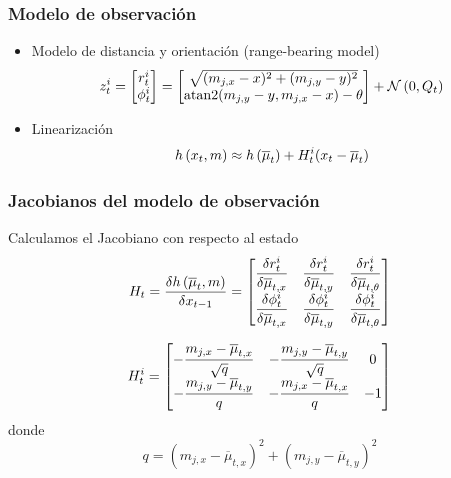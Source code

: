 \begin{frame}
	\frametitle{Modelo de observación}
	\begin{itemize}
	\item Modelo de distancia y orientación (range-bearing model)
	\begin{equation*}
		z_{t}^{i} =
		\begin{bmatrix}
			r_{t}^{i}\\
			\phi_{t}^{i} 
		\end{bmatrix} =
		\begin{bmatrix}
			\sqrt{(m_{j,x}-x)^{2} + (m_{j,y}-y)^{2}}\\
			\operatorname{atan2}(m_{j,y}-y, m_{j,x}-x) -\theta
		\end{bmatrix}
		+ \mathcal{N}\left( {0}, {Q_{t}} \right)		
	\end{equation*}
	
	\item Linearización
	\begin{equation*}
	h\left( x_{t}, m \right) \approx 			h\left( \overline{\mu}_{t} \right) + H_{t}^{i}(x_{t}-\overline{\mu}_{t})
	\end{equation*}
	\end{itemize}
	
\end{frame}

\begin{frame}
	\frametitle{Jacobianos del modelo de observación}
	Calculamos el Jacobiano con respecto al estado
	\begin{equation*}
		H_{t} = \dfrac{\delta h\left( \overline{\mu}_{t},m \right)}{\delta x_{t-1}} =
		\begin{bmatrix}
			\dfrac{\delta r_{t}^{i}}{\delta \overline{\mu}_{t,x}} & \dfrac{\delta r_{t}^{i}}{\delta \overline{\mu}_{t,y}} & \dfrac{\delta r_{t}^{i}}{\delta \overline{\mu}_{t,\theta}}\\
			\dfrac{\delta \phi_{t}^{i}}{\delta \overline{\mu}_{t,x}} & \dfrac{\delta \phi_{t}^{i}}{\delta \overline{\mu}_{t,y}} & \dfrac{\delta \phi_{t}^{i}}{\delta \overline{\mu}_{t,\theta}}
		\end{bmatrix}
	\end{equation*}
	
	\begin{equation*}
		H_{t}^{i} = 
		\begin{bmatrix}
			-\dfrac{m_{j,x} - \overline{\mu}_{t,x}}{\sqrt{q}} & -\dfrac{m_{j,y} - \overline{\mu}_{t,y}}{\sqrt{q}}  & 0\\
			-\dfrac{m_{j,y} - \overline{\mu}_{t,y}}{q}  & -\dfrac{m_{j,x} - \overline{\mu}_{t,x}}{q}  & -1
		\end{bmatrix}
	\end{equation*}
	donde
	\begin{equation*}
		q = (m_{j,x}-\overline{\mu}_{t,x})^{2} + (m_{j,y}-\overline{\mu}_{t,y})^{2}
	\end{equation*}
\end{frame}

